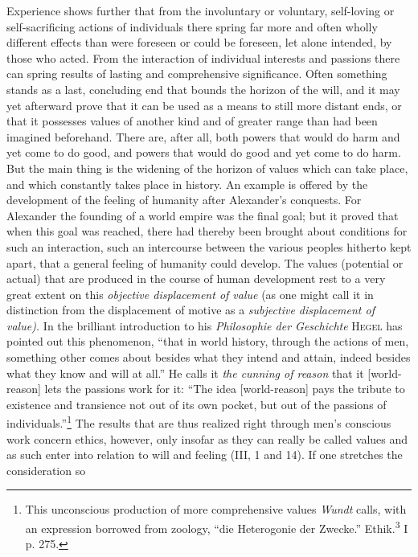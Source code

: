 \documentclass[12pt,a4paper,openany]{book}
\newcommand{\opage}[1]{\marginnote{\footnotesize\textit{[#1]}}}
\begin{document}
\opage{269}Experience shows further that from the involuntary or voluntary, self-loving or self-sacrificing actions of
individuals there spring far more and often wholly different effects than were foreseen or could be foreseen, let alone
intended, by those who acted. From the interaction of individual interests and passions there can spring results of
lasting and comprehensive significance. Often something stands as a last, concluding end that bounds the horizon of the
will, and it may yet afterward prove that it can be used as a means to still more distant ends, or that it possesses
values of another kind and of greater range than had been imagined beforehand. There are, after all, both powers that
would do harm and yet come to do good, and powers that would do good and yet come to do harm. But the main thing is the
widening of the horizon of values which can take place, and which constantly takes place in history. An example is
offered by the development of the feeling of humanity after Alexander's conquests. For Alexander the founding of a
world empire was the final goal; but it proved that when this goal was reached, there had thereby been brought about
conditions for such an interaction, such an intercourse between the various peoples hitherto kept apart, that a
general feeling of humanity could develop. The values (potential or actual) that are produced in the course of human
development rest to a very great extent on this \textit{objective displacement of value} (as one might call it in
distinction from the displacement of motive as a \textit{subjective displacement of value).} In the brilliant
introduction to his \textit{Philosophie der Geschichte} \textsc{Hegel} has pointed out this phenomenon, ``that in world
history, through the actions of men, something other comes about besides what they intend and attain, indeed besides
what they know and will at all.'' He calls it \textit{the cunning of reason} that it [world-reason] lets the passions
work for it: ``The idea [world-reason] pays the tribute to existence and transience not out of its own pocket, but out of
the passions of individuals.''\footnote[1]{This unconscious production of more comprehensive values \emph{Wundt} calls,
with an expression borrowed from zoology, ``die Heterogonie der Zwecke.'' Ethik.\textsuperscript{3} I p. 275.} The
results that are thus
\opage{270}realized right through men's conscious work concern ethics, however, only insofar as they can really be
called values and as such enter into relation to will and feeling (III, 1 and 14). If one stretches the consideration so
\end{document}
